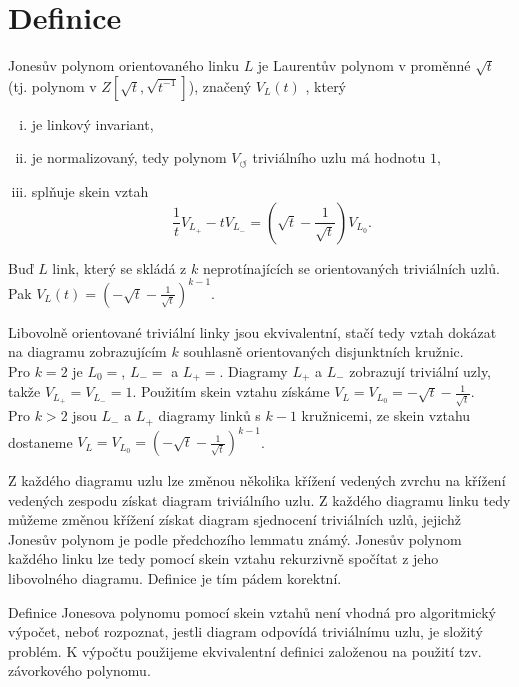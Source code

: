 \section{Definice}

\begin{definice}\label{def01:1}
Jonesův polynom orientovaného linku $L$ je Laurentův polynom v proměnné $\sqrt t$ (tj. polynom v $Z[\sqrt t, \sqrt{t^{-1}}]$), značený $V_L(t)$ , který
\begin{enumerate}[i.]
\item
je linkový invariant,
\item 
  je normalizovaný, tedy polynom  $V_\circlearrowleft$ triviálního uzlu má hodnotu $1,$
\item  
splňuje skein vztah 
$$ \frac{1}{t} V_{L_+} - t V_{L_-} = (\sqrt{t}  - \frac{1}{\sqrt{t}}) V_{L_0}.$$
\end{enumerate}
\end{definice}

\begin{lemma}
Buď $L$ link, který se skládá z $k$ neprotínajících se orientovaných triviálních uzlů. Pak $V_L(t) = (- \sqrt{t} -\frac{1}{\sqrt{t}} )^{k-1}	$.
\end{lemma}
\begin{dukaz}
Libovolně orientované triviální linky jsou ekvivalentní, stačí tedy vztah dokázat na diagramu zobrazujícím $k$ souhlasně orientovaných disjunktních kružnic.\\
Pro $k = 2$ je $L_0 = $, $L_- = $ a $L_+ = $. Diagramy $L_+$ a $L_-$ zobrazují triviální uzly, takže $V_{L_+} = V_{L_-} = 1$. Použitím skein vztahu získáme $V_ L = V_{L_0} = - \sqrt{t} -\frac{1}{\sqrt{t}} 	$. \\
Pro $k > 2$ jsou $L_-$ a $L_+ $ diagramy linků s $k-1$ kružnicemi, ze skein vztahu dostaneme $V_ L = V_{L_0} = (- \sqrt{t} -\frac{1}{\sqrt{t}} )^{k-1}$.
\end{dukaz}  
\begin{pozn}
Z každého diagramu uzlu lze změnou několika křížení vedených zvrchu na křížení vedených zespodu získat diagram triviálního uzlu. Z každého diagramu linku tedy můžeme změnou křížení získat diagram sjednocení triviálních uzlů, jejichž Jonesův polynom je podle předchozího lemmatu známý. Jonesův polynom každého linku lze tedy pomocí skein vztahu rekurzivně spočítat z jeho libovolného diagramu. Definice je tím pádem korektní.
\end{pozn}

Definice Jonesova polynomu pomocí skein vztahů není vhodná pro algoritmický výpočet, neboť rozpoznat, jestli diagram odpovídá triviálnímu uzlu, je složitý problém. K výpočtu použijeme ekvivalentní definici založenou na použití tzv. závorkového polynomu.

